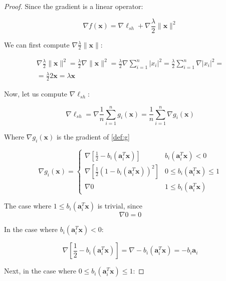 \documentclass[12pt]{article}
\newcommand{\xb}{\mathbf{x}}
\newcommand{\ab}{\mathbf{a}}
\newcommand{\abi}{\ab_i}
\newcommand{\xnorm}{\lVert \mathbf{\xb} \rVert}
\newcommand{\sumin}{\sum_{i = 1}^n}
\newcommand{\ellsh}{\ell_{sh}}
\newcommand{\ax}{\abi^T\xb}
\begin{document}
\begin{proof}
Since the gradient is a linear operator:

\begin{equation}
    \nabla f(\xb) = \nabla \ellsh + \nabla \frac{\lambda}{2} \xnorm ^ 2
\end{equation}

We can first compute $\nabla \frac{\lambda}{2} \xnorm$:

\begin{gather}
    \nabla \frac{\lambda}{2} \xnorm ^ 2 =
    \frac{\lambda}{2} \nabla \xnorm ^ 2 =
    \frac{\lambda}{2} \nabla \sumin |x_i|^2 = \nonumber
    \frac{\lambda}{2} \sumin \nabla |x_i|^2 = \\
     = \frac{\lambda}{2}2\xb =
    \lambda \xb \label{eq:grad_lambda}
\end{gather}

Now, let us compute $\nabla \ellsh$:

\begin{equation}
    \nabla \ellsh = \nabla \frac{1}{n} \sumin g_i(\xb) = \frac{1}{n} \sumin \nabla g_i(\xb)
\end{equation}

Where $\nabla g_i(\xb)$ is the gradient of \eqref{def:g}

\begin{equation}
    \nabla g_i(\xb) = \begin{cases}
        \nabla \left [\frac{1}{2} - b_i(\ax)\right]         & b_i(\ax) < 0 \\
        \nabla \left [\frac{1}{2}(1 - b_i(\ax))^2\right]    & 0 \leq b_i(\ax) \leq 1 \\
        \nabla 0                                            & 1 \le b_i(\ax)
    \end{cases}
\end{equation}

The case where $1 \le b_i(\ax)$ is trivial, since
\begin{equation} \label{eq:grad_0_case}
    \nabla 0 = 0
\end{equation}

In the case where $b_i(\ax) < 0$:

\begin{equation} \label{eq:grad_linear_case}
    \nabla \left [\frac{1}{2} - b_i(\ax)\right] = \nabla -b_i(\ax) = -b_i\abi
\end{equation}

Next, in the case where $0 \leq b_i(\ax) \leq 1$:


\end{proof}
\end{document}
